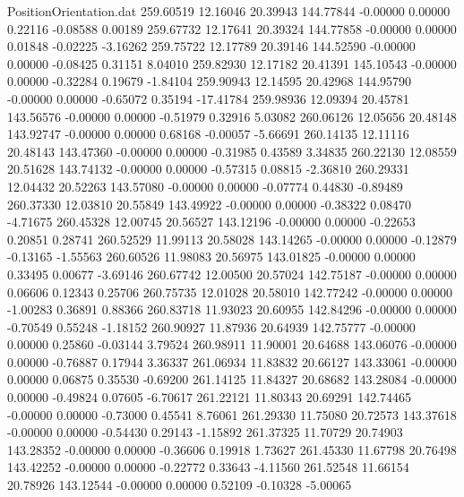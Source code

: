 \begin{filecontents}{PositionOrientation.dat}
 259.60519   12.16046   20.39943   144.77844   -0.00000    0.00000    0.22116   -0.08588    0.00189
 259.67732   12.17641   20.39324   144.77858   -0.00000    0.00000    0.01848   -0.02225   -3.16262
 259.75722   12.17789   20.39146   144.52590   -0.00000    0.00000   -0.08425    0.31151    8.04010
 259.82930   12.17182   20.41391   145.10543   -0.00000    0.00000   -0.32284    0.19679   -1.84104
 259.90943   12.14595   20.42968   144.95790   -0.00000    0.00000   -0.65072    0.35194  -17.41784
 259.98936   12.09394   20.45781   143.56576   -0.00000    0.00000   -0.51979    0.32916    5.03082
 260.06126   12.05656   20.48148   143.92747   -0.00000    0.00000    0.68168   -0.00057   -5.66691
 260.14135   12.11116   20.48143   143.47360   -0.00000    0.00000   -0.31985    0.43589    3.34835
 260.22130   12.08559   20.51628   143.74132   -0.00000    0.00000   -0.57315    0.08815   -2.36810
 260.29331   12.04432   20.52263   143.57080   -0.00000    0.00000   -0.07774    0.44830   -0.89489
 260.37330   12.03810   20.55849   143.49922   -0.00000    0.00000   -0.38322    0.08470   -4.71675
 260.45328   12.00745   20.56527   143.12196   -0.00000    0.00000   -0.22653    0.20851    0.28741
 260.52529   11.99113   20.58028   143.14265   -0.00000    0.00000   -0.12879   -0.13165   -1.55563
 260.60526   11.98083   20.56975   143.01825   -0.00000    0.00000    0.33495    0.00677   -3.69146
 260.67742   12.00500   20.57024   142.75187   -0.00000    0.00000    0.06606    0.12343    0.25706
 260.75735   12.01028   20.58010   142.77242   -0.00000    0.00000   -1.00283    0.36891    0.88366
 260.83718   11.93023   20.60955   142.84296   -0.00000    0.00000   -0.70549    0.55248   -1.18152
 260.90927   11.87936   20.64939   142.75777   -0.00000    0.00000    0.25860   -0.03144    3.79524
 260.98911   11.90001   20.64688   143.06076   -0.00000    0.00000   -0.76887    0.17944    3.36337
 261.06934   11.83832   20.66127   143.33061   -0.00000    0.00000    0.06875    0.35530   -0.69200
 261.14125   11.84327   20.68682   143.28084   -0.00000    0.00000   -0.49824    0.07605   -6.70617
 261.22121   11.80343   20.69291   142.74465   -0.00000    0.00000   -0.73000    0.45541    8.76061
 261.29330   11.75080   20.72573   143.37618   -0.00000    0.00000   -0.54430    0.29143   -1.15892
 261.37325   11.70729   20.74903   143.28352   -0.00000    0.00000   -0.36606    0.19918    1.73627
 261.45330   11.67798   20.76498   143.42252   -0.00000    0.00000   -0.22772    0.33643   -4.11560
 261.52548   11.66154   20.78926   143.12544   -0.00000    0.00000    0.52109   -0.10328   -5.00065

\end{filecontents}
